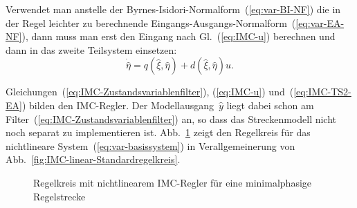 Verwendet man anstelle der Byrnes-Isidori-Normalform~(\ref{eq:var-BI-NF})
die in der Regel leichter zu berechnende Eingangs-Ausgangs-Normalform~(\ref{eq:var-EA-NF}),
dann muss man erst den Eingang nach Gl.~(\ref{eq:IMC-u}) berechnen
und dann in das zweite Teilsystem einsetzen: 
\begin{equation}
\dot{\hat{\eta}}=q(\hat{\xi},\hat{\eta})+d(\hat{\xi},\hat{\eta})u.\label{eq:IMC-TS2-EA}
\end{equation}

Gleichungen~(\ref{eq:IMC-Zustandsvariablenfilter}), (\ref{eq:IMC-u})
und~(\ref{eq:IMC-TS2-EA}) bilden den IMC-Regler. Der Modell\-ausgang~$\hat{y}$
liegt dabei schon am Filter~(\ref{eq:IMC-Zustandsvariablenfilter})
an, so dass das Streckenmodell nicht noch separat zu implementieren
ist. Abb.~\ref{fig:Regelkreis-IMC-nichtlinear} zeigt den Regelkreis
für das nichtlineare System~(\ref{eq:var-basissystem}) in Verallgemeinerung
von Abb.~\ref{fig:IMC-linear-Standardregelkreis}. 

\begin{figure}
\begin{centering}
\resizebox{1\textwidth}{!}{}
\par\end{centering}
\caption{Regelkreis mit nichtlinearem IMC-Regler für eine minimalphasige Regelstrecke\label{fig:Regelkreis-IMC-nichtlinear}}

\end{figure}

